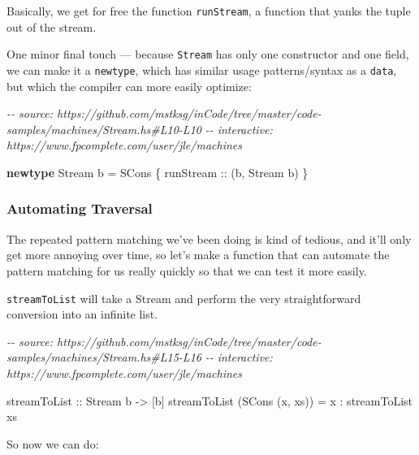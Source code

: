 \documentclass[]{article}
\newenvironment{Shaded}{}{}
\newcommand{\CommentTok}[1]{\textcolor[rgb]{0.38,0.63,0.69}{\textit{#1}}}
\newcommand{\DataTypeTok}[1]{\textcolor[rgb]{0.56,0.13,0.00}{#1}}
\newcommand{\KeywordTok}[1]{\textcolor[rgb]{0.00,0.44,0.13}{\textbf{#1}}}
\newcommand{\NormalTok}[1]{#1}
\newcommand{\OperatorTok}[1]{\textcolor[rgb]{0.40,0.40,0.40}{#1}}
\newcommand{\OtherTok}[1]{\textcolor[rgb]{0.00,0.44,0.13}{#1}}
\begin{document}
Basically, we get for free the function \texttt{runStream}, a function that
yanks the tuple out of the stream.

One minor final touch --- because \texttt{Stream} has only one constructor and
one field, we can make it a \texttt{newtype}, which has similar usage
patterns/syntax as a \texttt{data}, but which the compiler can more easily
optimize:

\begin{Shaded}
\begin{Highlighting}[]
\CommentTok{{-}{-} source: https://github.com/mstksg/inCode/tree/master/code{-}samples/machines/Stream.hs\#L10{-}L10}
\CommentTok{{-}{-} interactive: https://www.fpcomplete.com/user/jle/machines}

\KeywordTok{newtype} \DataTypeTok{Stream}\NormalTok{ b }\OtherTok{=} \DataTypeTok{SCons}\NormalTok{ \{}\OtherTok{ runStream ::}\NormalTok{ (b, }\DataTypeTok{Stream}\NormalTok{ b) \}}
\end{Highlighting}
\end{Shaded}

\subsubsection{Automating Traversal}\label{automating-traversal}

The repeated pattern matching we've been doing is kind of tedious, and it'll
only get more annoying over time, so let's make a function that can automate the
pattern matching for us really quickly so that we can test it more easily.

\texttt{streamToList} will take a Stream and perform the very straightforward
conversion into an infinite list.

\begin{Shaded}
\begin{Highlighting}[]
\CommentTok{{-}{-} source: https://github.com/mstksg/inCode/tree/master/code{-}samples/machines/Stream.hs\#L15{-}L16}
\CommentTok{{-}{-} interactive: https://www.fpcomplete.com/user/jle/machines}

\OtherTok{streamToList ::} \DataTypeTok{Stream}\NormalTok{ b }\OtherTok{{-}\textgreater{}}\NormalTok{ [b]}
\NormalTok{streamToList (}\DataTypeTok{SCons}\NormalTok{ (x, xs)) }\OtherTok{=}\NormalTok{ x }\OperatorTok{:}\NormalTok{ streamToList xs}
\end{Highlighting}
\end{Shaded}

So now we can do:
\end{document}
